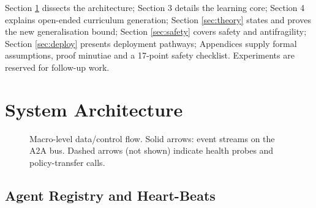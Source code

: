 Section \ref{sec:arch} dissects the architecture; Section 3 details the
learning core; Section 4 explains open-ended curriculum generation;
Section \ref{sec:theory} states and proves the new generalisation
bound; Section \ref{sec:safety} covers safety and antifragility;  
Section \ref{sec:deploy} presents deployment pathways; Appendices supply
formal assumptions, proof minutiae and a 17-point safety checklist.  
Experiments are reserved for follow-up work.

\section{System Architecture}\label{sec:arch}

\begin{figure}[t]\centering
{}
\caption{Macro-level data/control flow.  Solid arrows: event streams on the
\textsc{A2A} bus.  Dashed arrows (not shown) indicate health probes and
policy-transfer calls.}
\label{fig:arch}
\end{figure}

\vspace{-0.7\baselineskip}
\subsection{Agent Registry and Heart-Beats}

